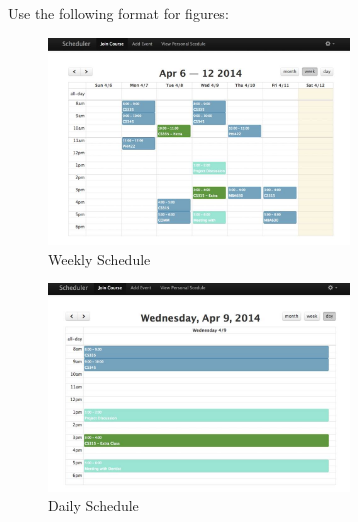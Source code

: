 \documentclass[twocolumn]{article}
\begin{document}





Use the following format for figures:

\begin{figure}[t]
	\centering
	\includegraphics[width=80mm]{week.jpg}
	\caption{Weekly Schedule}
	\label{weekly schedule}
\end{figure}

\begin{figure}[t]
	\centering
	\includegraphics[width=80mm]{day.jpg}
	\caption{Daily Schedule}
	\label{weekly schedule}
\end{figure}
\end{document}
